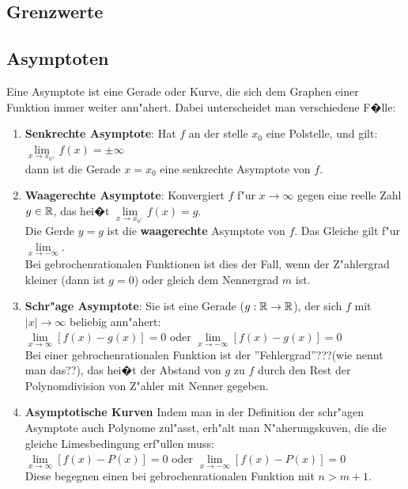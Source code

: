 \subsection{Grenzwerte}



\subsection{Asymptoten}

Eine Asymptote ist eine Gerade oder Kurve, die sich dem Graphen einer Funktion immer weiter ann"ahert. Dabei unterscheidet man verschiedene F�lle:\\
\begin{enumerate}
\item \textbf{Senkrechte Asymptote}: Hat $f$ an der stelle $x_{0}$ eine Polstelle, und gilt:\\
$\lim\limits_{x \rightarrow x_{0^{+}}} f(x) = \pm \infty$\\
dann ist die Gerade $x=x_{0}$ eine senkrechte Asymptote von $f$.\\
\item \textbf{Waagerechte Asymptote}: Konvergiert $f$ f"ur $x\rightarrow \infty$ gegen eine reelle Zahl $g\in \mathbb{R}$, das hei�t $\lim\limits_{x \rightarrow x_{0^{+}}}{f(x)}=g$.\\
Die Gerde $y=g$ ist die \textbf{waagerechte} Asymptote von $f$. Das Gleiche gilt f"ur $\lim\limits_{x \rightarrow -\infty}$.\\
Bei gebrochenrationalen Funktionen ist dies der Fall, wenn der Z"ahlergrad kleiner (dann ist $g=0$) oder gleich dem Nennergrad $m$ ist.\\
\item \textbf{Schr"age Asymptote}: Sie ist eine Gerade ($g:\mathbb{R} \rightarrow \mathbb{R}$), der sich $f$ mit $|x|\rightarrow \infty$ beliebig ann"ahert:\\
$\lim\limits_{x \rightarrow \infty}{[f(x)-g(x)]}=0$ oder $\lim\limits_{x \rightarrow -\infty}{[f(x)-g(x)]}=0$\\
Bei einer gebrochenrationalen Funktion ist der ''Fehlergrad''???(wie nennt man das??), das hei�t der Abstand von $g$ zu $f$ durch den Rest der Polynomdivision von Z"ahler mit Nenner gegeben.\\
\item \textbf{Asymptotische Kurven} Indem man in der Definition der schr"agen Asymptote auch Polynome zul"asst, erh"alt man N"aherungskuven, die die gleiche Limesbedingung erf"ullen muss:\\
$\lim\limits_{x \rightarrow \infty}{[f(x)-P(x)]}=0$ oder $\lim\limits_{x \rightarrow -\infty}{[f(x)-P(x)]}=0$\\
Diese begegnen einen bei gebrochenrationalen Funktion mit $n>m+1$.\\
\end{enumerate}


